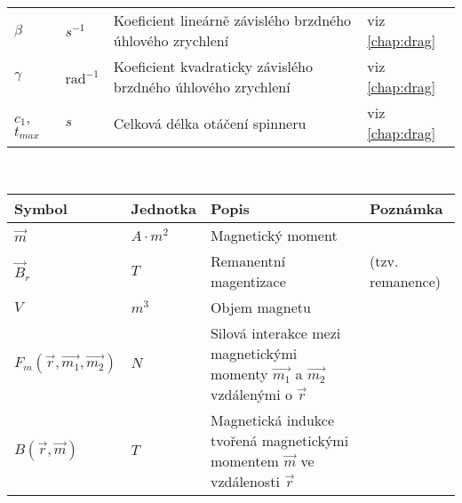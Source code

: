 \documentclass[12pt, a4paper,
 twoside,        %
 openright
]{report}
\begin{document}
\begin{table}[!ht]
\begin{tabularx}{\textwidth}{m{} m{} p{} p{5cm} }
        $\beta$          & $s^{-1}$                  & Koeficient lineárně závislého brzdného úhlového zrychlení     & viz \autoref{chap:drag}                        \\
        $\gamma$         & $\text{rad}^{-1}$         & Koeficient kvadraticky závislého brzdného úhlového zrychlení  & viz \autoref{chap:drag}                        \\
        $c_1$, $t_{max}$ & $s$                       & Celková délka otáčení spinneru                                & viz \autoref{chap:drag}                        \\
    \end{tabularx}

    \vspace{24pt}

     \\
    \begin{tabularx}{\textwidth}{m{} m{} p{} p{4cm} }
        \textbf{Symbol}                      & \textbf{Jednotka}                                                            & \textbf{Popis}                                                                              & \textbf{Poznámka}                      \\
        \hline
        $\vec{m}$                            & $A \cdot m^2$                                                                & Magnetický moment                                                                                                                    \\
        $\vec{B}_r$                          & $T$                                                                          & Remanentní magentizace                                                                      & (tzv. remanence)                       \\
        $V$                                  & $m^3$                                                                        & Objem magnetu                                                                                                                        \\
        $F_m(\vec{r}, \vec{m_1}, \vec{m_2})$ & $N$                                                                          & Silová interakce mezi magnetickými momenty $\vec{m_1}$ a $\vec{m_2}$ vzdálenými o $\vec{r}$ & \cite{magnetic_force}                  \\
        $B(\vec{r}, \vec{m})$                & $T$                                                                          & Magnetická indukce tvořená magnetickými momentem $\vec{m}$ ve vzdálenosti $\vec{r}$         & \cite{magnetic_force, magnetic_torque} \\

\end{tabularx}
\end{table}
\end{document}
